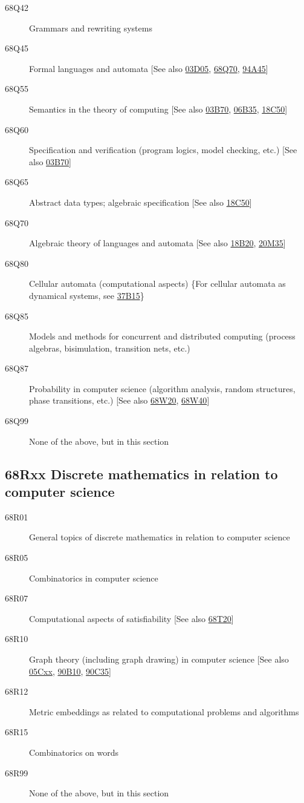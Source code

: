 \documentclass[letterpaper]{article}
\begin{document}
\begin{description}
\item [68Q42]\label{68Q42} Grammars and rewriting systems
\item [68Q45]\label{68Q45} Formal languages and automata [See also \hyperref[03D05]{03D05}, \hyperref[68Q70]{68Q70}, \hyperref[94A45]{94A45}]
\item [68Q55]\label{68Q55} Semantics in the theory of computing [See also \hyperref[03B70]{03B70}, \hyperref[06B35]{06B35}, \hyperref[18C50]{18C50}]
\item [68Q60]\label{68Q60} Specification and verification (program logics, model checking, etc.) [See also \hyperref[03B70]{03B70}]
\item [68Q65]\label{68Q65} Abstract data types; algebraic specification [See also \hyperref[18C50]{18C50}]
\item [68Q70]\label{68Q70} Algebraic theory of languages and automata [See also \hyperref[18B20]{18B20}, \hyperref[20M35]{20M35}]
\item [68Q80]\label{68Q80} Cellular automata (computational aspects) \{For cellular automata as dynamical systems, see \hyperref[37B15]{37B15}\}
\item [68Q85]\label{68Q85} Models and methods for concurrent and distributed computing (process algebras, bisimulation, transition nets, etc.)
\item [68Q87]\label{68Q87} Probability in computer science (algorithm analysis, random structures, phase transitions, etc.) [See also \hyperref[68W20]{68W20}, \hyperref[68W40]{68W40}]
\item [68Q99]\label{68Q99} None of the above, but in this section
\end{description}
\subsection*{68Rxx  Discrete mathematics in relation to computer science }\label{68Rxx}
\begin{description}
\item [68R01]\label{68R01} General topics of discrete mathematics in relation to computer science
\item [68R05]\label{68R05} Combinatorics in computer science
\item [68R07]\label{68R07} Computational aspects of satisfiability [See also \hyperref[68T20]{68T20}]
\item [68R10]\label{68R10} Graph theory (including graph drawing) in computer science [See also \hyperref[05Cxx]{05Cxx}, \hyperref[90B10]{90B10}, \hyperref[90C35]{90C35}]
\item [68R12]\label{68R12} Metric embeddings as related to computational problems and algorithms
\item [68R15]\label{68R15} Combinatorics on words 
\item [68R99]\label{68R99} None of the above, but in this section
\end{description}
\end{document}
